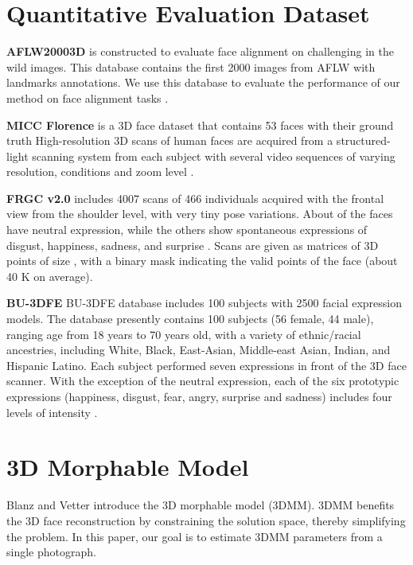 \documentclass[runningheads]{llncs}
\begin{document}
\section{Quantitative Evaluation Dataset}  \label{sec_eval_dataset}

\textbf{AFLW20003D} is constructed to evaluate face alignment on challenging in the wild images. This database contains the first 2000 images from AFLW \cite{dataset_alfw} with landmarks annotations. We use this database to evaluate the performance of our method on face alignment tasks \cite{dataset_aflw20003D_300WLP_zhu2016face}.

\noindent
\textbf{MICC Florence} is a 3D face dataset that contains 53 faces with their ground truth 
High-resolution 3D scans of human faces are acquired from a structured-light scanning system from each subject with several video sequences of varying resolution, conditions and zoom level \cite{dataset_florence}.

\noindent
\textbf{FRGC v2.0} includes 4007 scans of 466 individuals acquired with the frontal view from the shoulder level, with very tiny pose variations. 
About  of the faces have neutral expression, while the others show spontaneous expressions of disgust, happiness, sadness, and surprise  \cite{dataset_frgc}. 
Scans are given as matrices of 3D points of size , with a binary mask indicating the valid points of the face (about 40 K on average). 

\noindent
\textbf{BU-3DFE} 
BU-3DFE database includes 100 subjects with 2500 facial expression models. 
The database presently contains 100 subjects (56 female, 44 male), ranging age from 18 years to 70 years old, with a variety of ethnic/racial ancestries, including White, Black, East-Asian, Middle-east Asian, Indian, and Hispanic Latino. Each subject performed seven expressions in front of the 3D face scanner. With the exception of the neutral expression, each of the six prototypic expressions (happiness, disgust, fear, angry, surprise and sadness) includes four levels of intensity \cite{dataset_bu3dfe_yin20063d,dataset_bu4dfe_yin20063d}. 

\section{3D Morphable Model}  \label{sec_3dmm}
Blanz and Vetter \cite{intro_3dmm_blanz1999morphable} introduce the 3D morphable model (3DMM). 
3DMM benefits the 3D face reconstruction by constraining the solution space, thereby simplifying the problem. 
In this paper, our goal is to estimate 3DMM parameters from a single photograph. 
\end{document}
